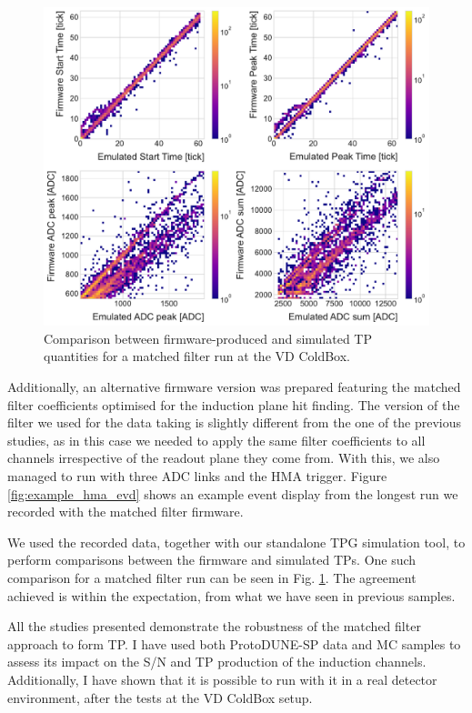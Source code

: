 \begin{figure}[t]
    \centering
    \includegraphics[scale = 0.5]{Images/Matched_Filter/np02_coldbox_tp_comp.pdf}
    \caption[Comparison between firmware-produced and simulated TP quantities for a matched filter run at the VD ColdBox.]{Comparison between firmware-produced and simulated TP quantities for a matched filter run at the VD ColdBox.}
    \label{fig:vdcoldbox_tp_comp}
\end{figure}

Additionally, an alternative firmware version was prepared featuring the matched filter coefficients optimised for the induction plane hit finding. The version of the filter we used for the data taking is slightly different from the one of the previous studies, as in this case we needed to apply the same filter coefficients to all channels irrespective of the readout plane they come from. With this, we also managed to run with three ADC links and the HMA trigger. Figure \ref{fig:example_hma_evd} shows an example event display from the longest run we recorded with the matched filter firmware.

We used the recorded data, together with our standalone TPG simulation tool, to perform comparisons between the firmware and simulated TPs. One such comparison for a matched filter run can be seen in Fig. \ref{fig:vdcoldbox_tp_comp}. The agreement achieved is within the expectation, from what we have seen in previous samples.

All the studies presented demonstrate the robustness of the matched filter approach to form TP. I have used both ProtoDUNE-SP data and MC samples to assess its impact on the S/N and TP production of the induction channels. Additionally, I have shown that it is possible to run with it in a real detector environment, after the tests at the VD ColdBox setup.